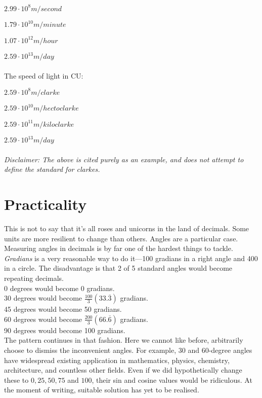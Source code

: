 \(2.99\cdot10^8 m/second\)

\(1.79\cdot10^{10}m/minute\)

\(1.07\cdot10^{12}m/hour\)

\(2.59\cdot10^{13}m/day\)
\\~\\
The speed of light in CU\@:

\(2.59\cdot10^8 m/clarke\)

\(2.59\cdot10^{10} m/hectoclarke\)

\(2.59\cdot10^{11} m/kiloclarke\)

\(2.59\cdot10^{13} m/day\)
\\~\\
\textit{Disclaimer: The above is cited purely as an example, and does not attempt to define the standard for clarkes.}

\section{Practicality}
This is not to say that it's all roses and unicorns in the land of decimals.
Some units are more resilient to change than others.
Angles are a particular case. Measuring angles in decimals is by far one of the hardest things to tackle.
\textit{Gradians} is a very reasonable way to do it—100 gradians in a right angle and 400 in a circle. The disadvantage is that 2 of 5 standard angles would become repeating decimals.\\
0 degrees would become 0 gradians.\\
30 degrees would become \(\frac{100}{3}(33.\overline{3})\) gradians.\\
45 degrees would become 50 gradians.\\
60 degrees would become \(\frac{200}{3}(66.\overline{6})\) gradians.\\
90 degrees would become 100 gradians.\\
The pattern continues in that fashion.
Here we cannot like before, arbitrarily choose to dismiss the inconvenient angles.
For example, 30 and 60-degree angles have widespread existing application in mathematics, physics, chemistry, architecture, and countless other fields.
Even if we did hypothetically change these to \(0,25,50,75\) and \(100\), their sin and cosine values would be ridiculous.
At the moment of writing, suitable solution has yet to be realised.
